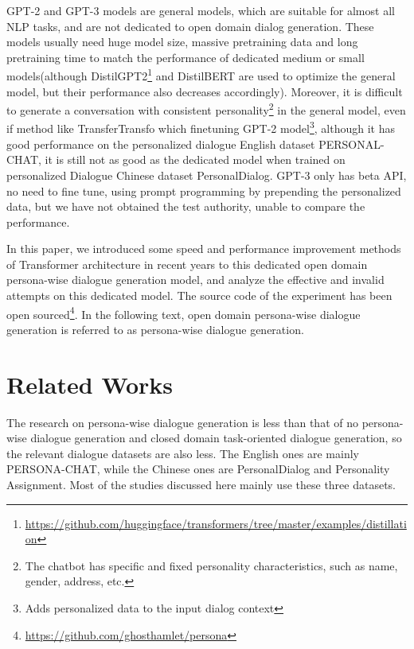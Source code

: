 \documentclass[letterpaper]{article} %
\DeclareRobustCommand{\citeext}[1]{\cite[#1]{#1}}
\begin{document}
GPT-2 and GPT-3 models are general models, which are suitable for almost all NLP tasks, and are not dedicated to open domain dialog generation. These models usually need huge model size, massive pretraining data and long pretraining time to match the performance of dedicated medium or small models(although DistilGPT2\footnote{\url{https://github.com/huggingface/transformers/tree/master/examples/distillation}} and DistilBERT\citeext{Sanh2019} are used to optimize the general model, but their performance also decreases accordingly). 
Moreover, it is difficult to generate a conversation with consistent personality\footnote{The chatbot has specific and fixed personality characteristics, such as name, gender, address, etc.} in the general model, even if method like TransferTransfo\citeext{Wolf2019} which finetuning GPT-2 model\footnote{Adds personalized data to the input dialog context}, although it has good performance on the personalized dialogue English dataset PERSONAL-CHAT\citeext{Zhang2018}, it is still not as good as the dedicated model\citeext{Zheng2019} when trained on personalized Dialogue Chinese dataset PersonalDialog\citeext{Zheng2019a}. GPT-3 only has beta API, no need to fine tune, using prompt programming by prepending the personalized data, but we have not obtained the test authority, unable to compare the performance. 

In this paper, we introduced some speed and performance improvement methods of Transformer architecture in recent years to this dedicated open domain persona-wise dialogue generation model\citeext{Zheng2019}, and analyze the effective and invalid attempts on this dedicated model. The source code of the experiment has been open sourced\footnote{\url{https://github.com/ghosthamlet/persona}}. In the following text, open domain persona-wise dialogue generation is referred to as persona-wise dialogue generation. 

\section[Related Works]{Related Works} 
The research on persona-wise dialogue generation is less than that of no persona-wise dialogue generation and closed domain task-oriented dialogue generation, so the relevant dialogue datasets are also less. The English ones are mainly PERSONA-CHAT\citeext{Zhang2018}, while the Chinese ones are PersonalDialog\citeext{Zheng2019a} and Personality Assignment\citeext{Qian2017}. Most of the studies discussed here mainly use these three datasets. 
\end{document}
